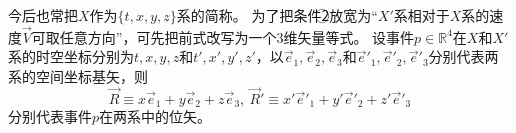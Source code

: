 今后也常把$X$作为$\{t, x, y, z\}$系的简称。
为了把条件\textcircled{2}放宽为``$X'$系相对于$X$系的速度$\vec V$可取任意方向''，可先把前式改写为一个$3$维矢量等式。
设事件$p \in \mathbb{R}^4$在$X$和$X'$系的时空坐标分别为$t, x, y, z$和$t', x', y', z'$，以$\vec e_1, \vec e_2, \vec e_3$和$\vec e'_1, \vec e'_2, \vec e'_3$分别代表两系的空间坐标基矢，则
$$\vec R \equiv x\vec e_1 + y\vec e_2 + z\vec e_3, ~ \vec R' \equiv x'\vec e'_1 + y'\vec e'_2 + z'\vec e'_3$$
分别代表事件$p$在两系中的位矢。

\fi
